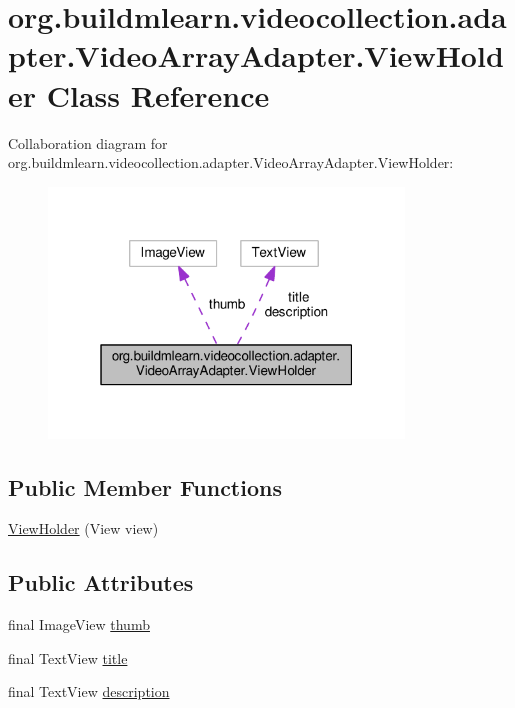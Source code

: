 \hypertarget{classorg_1_1buildmlearn_1_1videocollection_1_1adapter_1_1VideoArrayAdapter_1_1ViewHolder}{}\section{org.\+buildmlearn.\+videocollection.\+adapter.\+Video\+Array\+Adapter.\+View\+Holder Class Reference}
\label{classorg_1_1buildmlearn_1_1videocollection_1_1adapter_1_1VideoArrayAdapter_1_1ViewHolder}


Collaboration diagram for org.\+buildmlearn.\+videocollection.\+adapter.\+Video\+Array\+Adapter.\+View\+Holder\+:
\nopagebreak
\begin{figure}[H]
\begin{center}
\leavevmode
\includegraphics[width=268pt]{classorg_1_1buildmlearn_1_1videocollection_1_1adapter_1_1VideoArrayAdapter_1_1ViewHolder__coll__graph}
\end{center}
\end{figure}
\subsection*{Public Member Functions}
\begin{DoxyCompactItemize}
\item 
\hyperlink{classorg_1_1buildmlearn_1_1videocollection_1_1adapter_1_1VideoArrayAdapter_1_1ViewHolder_ad9d36a8cbbeb1838c5ba7912c4158a1f}{View\+Holder} (View view)
\end{DoxyCompactItemize}
\subsection*{Public Attributes}
\begin{DoxyCompactItemize}
\item 
final Image\+View \hyperlink{classorg_1_1buildmlearn_1_1videocollection_1_1adapter_1_1VideoArrayAdapter_1_1ViewHolder_a1cd95c3d5dde5b650697ff22ab29d774}{thumb}
\item 
final Text\+View \hyperlink{classorg_1_1buildmlearn_1_1videocollection_1_1adapter_1_1VideoArrayAdapter_1_1ViewHolder_a2bd0a50f4c29e314d0a8302683593aec}{title}
\item 
final Text\+View \hyperlink{classorg_1_1buildmlearn_1_1videocollection_1_1adapter_1_1VideoArrayAdapter_1_1ViewHolder_afbd013673d761b96721dcc97576768d0}{description}
\end{DoxyCompactItemize}


